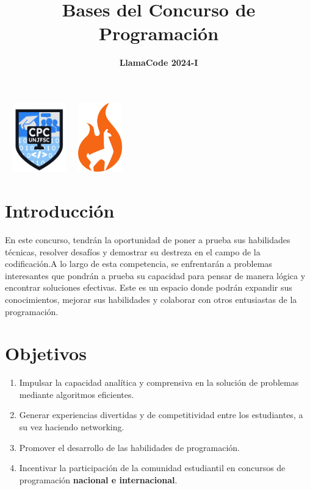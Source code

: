 \documentclass{article}
\date{}
\title{Bases del Concurso de Programación}
\author{\textbf{LlamaCode 2024-I}}
\begin{document}
\maketitle
\begin{center}
    \includegraphics[width=3cm, height=3cm]{logo-club.png}
    \includegraphics[width=2cm, height=3cm]{llamafood.png}
\end{center}
\section{Introducción}

En este concurso, tendrán la oportunidad de poner a prueba sus habilidades técnicas, resolver desafíos y demostrar su destreza en el campo de la codificación.A lo largo de esta competencia, se enfrentarán a problemas interesantes que pondrán a prueba su capacidad para pensar de manera lógica y encontrar soluciones efectivas. Este es un espacio donde podrán expandir sus conocimientos, mejorar sus habilidades y colaborar con otros entusiastas de la programación.


\section{Objetivos}
\begin{enumerate}
    \item Impulsar la capacidad analítica y comprensiva en la solución de problemas mediante algoritmos eficientes.
    \item Generar experiencias divertidas y de competitividad entre los estudiantes, a su vez haciendo networking.
    \item Promover el desarrollo de las habilidades de programación.
    \item Incentivar la participación de la comunidad estudiantil en concursos de programación \textbf{nacional e internacional}.
\end{enumerate}
\end{document}
